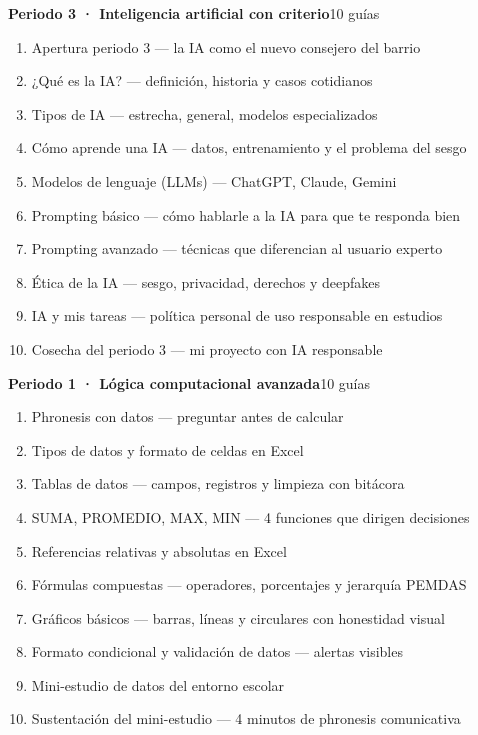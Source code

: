 \noindent\textbf{Periodo 3 · Inteligencia artificial con criterio}\hfill{\footnotesize\color{vinoInst}10 guías}\par
\begin{enumerate}[leftmargin=2.6em, itemsep=0.6pt, topsep=2pt, parsep=0pt, label=\footnotesize\arabic*.]
\footnotesize
  \item Apertura periodo 3 --- la IA como el nuevo consejero del barrio
  \item ¿Qué es la IA? --- definición, historia y casos cotidianos
  \item Tipos de IA --- estrecha, general, modelos especializados
  \item Cómo aprende una IA --- datos, entrenamiento y el problema del sesgo
  \item Modelos de lenguaje (LLMs) --- ChatGPT, Claude, Gemini
  \item Prompting básico --- cómo hablarle a la IA para que te responda bien
  \item Prompting avanzado --- técnicas que diferencian al usuario experto
  \item Ética de la IA --- sesgo, privacidad, derechos y deepfakes
  \item IA y mis tareas --- política personal de uso responsable en estudios
  \item Cosecha del periodo 3 --- mi proyecto con IA responsable
\end{enumerate}

\bigskip
{}
\vspace{1pt}\par\noindent{\color{vinoInst}\rule{\textwidth}{1pt}}
\vspace{3pt}

\noindent\textbf{Periodo 1 · Lógica computacional avanzada}\hfill{\footnotesize\color{vinoInst}10 guías}\par
\begin{enumerate}[leftmargin=2.6em, itemsep=0.6pt, topsep=2pt, parsep=0pt, label=\footnotesize\arabic*.]
\footnotesize
  \item Phronesis con datos --- preguntar antes de calcular
  \item Tipos de datos y formato de celdas en Excel
  \item Tablas de datos --- campos, registros y limpieza con bitácora
  \item SUMA, PROMEDIO, MAX, MIN --- 4 funciones que dirigen decisiones
  \item Referencias relativas y absolutas en Excel
  \item Fórmulas compuestas --- operadores, porcentajes y jerarquía PEMDAS
  \item Gráficos básicos --- barras, líneas y circulares con honestidad visual
  \item Formato condicional y validación de datos --- alertas visibles
  \item Mini-estudio de datos del entorno escolar
  \item Sustentación del mini-estudio --- 4 minutos de phronesis comunicativa
\end{enumerate}

